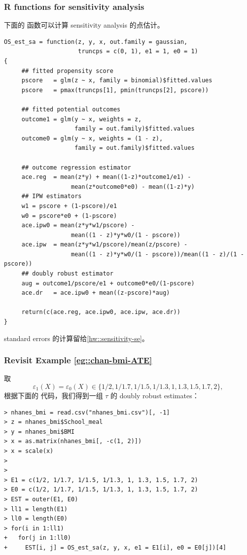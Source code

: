 \subsubsection{R functions for sensitivity analysis}


下面的  函数可以计算 sensitivity analysis 的点估计。

\begin{lstlisting}
OS_est_sa = function(z, y, x, out.family = gaussian, 
                     truncps = c(0, 1), e1 = 1, e0 = 1)
{
     ## fitted propensity score
     pscore   = glm(z ~ x, family = binomial)$fitted.values
     pscore   = pmax(truncps[1], pmin(truncps[2], pscore))
     
     ## fitted potential outcomes
     outcome1 = glm(y ~ x, weights = z, 
                    family = out.family)$fitted.values
     outcome0 = glm(y ~ x, weights = (1 - z), 
                    family = out.family)$fitted.values
     
     ## outcome regression estimator
     ace.reg  = mean(z*y) + mean((1-z)*outcome1/e1) - 
                   mean(z*outcome0*e0) - mean((1-z)*y) 
     ## IPW estimators
     w1 = pscore + (1-pscore)/e1
     w0 = pscore*e0 + (1-pscore)
     ace.ipw0 = mean(z*y*w1/pscore) - 
                   mean((1 - z)*y*w0/(1 - pscore))
     ace.ipw  = mean(z*y*w1/pscore)/mean(z/pscore) - 
                   mean((1 - z)*y*w0/(1 - pscore))/mean((1 - z)/(1 - pscore))
     ## doubly robust estimator
     aug = outcome1/pscore/e1 + outcome0*e0/(1-pscore)
     ace.dr   = ace.ipw0 + mean((z-pscore)*aug)

     return(c(ace.reg, ace.ipw0, ace.ipw, ace.dr))     
}
\end{lstlisting}

standard errors 的计算留给\cref{hw::sensitivity-se}。

\subsubsection{Revisit Example \cref{eg::chan-bmi-ATE}}


取
$$
\varepsilon_1(X) = \varepsilon_0(X) \in \{1/2, 1/1.7, 1/1.5, 1/1.3, 1, 1.3, 1.5, 1.7, 2\},
$$ 
根据下面的  代码，我们得到一组 $\tau$ 的 doubly robust estimates：
\begin{lstlisting}
> nhanes_bmi = read.csv("nhanes_bmi.csv")[, -1]
> z = nhanes_bmi$School_meal
> y = nhanes_bmi$BMI
> x = as.matrix(nhanes_bmi[, -c(1, 2)])
> x = scale(x)
> 
> 
> E1 = c(1/2, 1/1.7, 1/1.5, 1/1.3, 1, 1.3, 1.5, 1.7, 2)
> E0 = c(1/2, 1/1.7, 1/1.5, 1/1.3, 1, 1.3, 1.5, 1.7, 2)
> EST = outer(E1, E0)
> ll1 = length(E1)
> ll0 = length(E0)
> for(i in 1:ll1)
+   for(j in 1:ll0)
+     EST[i, j] = OS_est_sa(z, y, x, e1 = E1[i], e0 = E0[j])[4]
\end{lstlisting}




